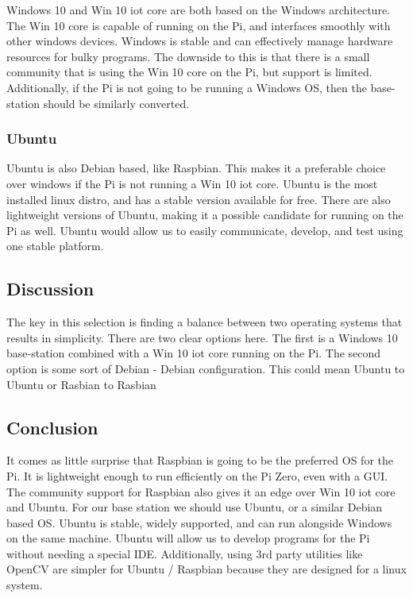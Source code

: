 \documentclass[letterpaper, 10, draftclsnofoot, onecolumn, compsoc]{IEEEtran}
\begin{document}
Windows 10 and Win 10 iot core\cite{r6} are both based on the Windows 
architecture. The Win 10 core is capable of running on the Pi, and 
interfaces smoothly with other windows devices. Windows is stable 
and can effectively manage hardware resources for bulky programs. 
The downside to this is that there is a small community that is 
using the Win 10 core on the Pi, but support is limited. 
Additionally, if the Pi is not going to be running a Windows OS, 
then the base-station should be similarly converted. 


\subsubsection{Ubuntu}

Ubuntu\cite{r7} is also Debian based, like Raspbian. This makes it a 
preferable choice over windows if the Pi is not running a Win 10 
iot core. Ubuntu is the most installed linux distro, and has a 
stable version available for free. There are also lightweight 
versions of Ubuntu, making it a possible candidate for running on 
the Pi as well. Ubuntu would allow us to easily communicate, 
develop, and test using one stable platform.  


\subsection{Discussion}

The key in this selection is finding a balance between two 
operating systems that results in simplicity. There are two clear 
options here. The first is a Windows 10 base-station combined with 
a Win 10 iot core running on the Pi. The second option is some sort 
of Debian - Debian configuration. This could mean Ubuntu to Ubuntu 
or Rasbian to Rasbian


\subsection{Conclusion}

It comes as little surprise that Raspbian is going to be the 
preferred OS for the Pi. It is lightweight enough to run 
efficiently on the Pi Zero, even with a GUI. The community support 
for Raspbian also gives it an edge over Win 10 iot core and Ubuntu. 
For our base station we should use Ubuntu, or a similar Debian 
based OS. Ubuntu is stable, widely supported, and can run alongside 
Windows on the same machine. Ubuntu will allow us to develop 
programs for the Pi without needing a special IDE. Additionally, 
using 3rd party utilities like OpenCV are simpler for Ubuntu / 
Raspbian because they are designed for a linux system.  
\end{document}
